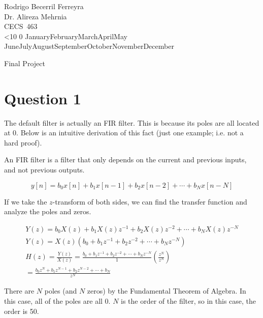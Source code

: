 \documentclass{article}
\renewcommand{\today}{\ifnum\number\day<10 0\fi \number\day \space%
\ifcase \month \or January\or February\or March\or April\or May%
\or June\or July\or August\or September\or October\or November\or December\fi\space%
\number \year}
\begin{document}
\noindent
Rodrigo Becerril Ferreyra\\
Dr. Alireza Mehrnia\\
CECS~463\\
\today

\noindent
{\centering Final Project}

\section*{Question 1}
The default filter is actually an FIR filter. This is because
its poles are all located at 0. Below is an intuitive derivation of
this fact (just one example; i.e. not a hard proof).

An FIR filter is a filter that only depends on the current and
previous inputs, and not previous outputs.

\begin{equation*}
    y[n] = b_0 x[n] + b_1 x[n-1] + b_2 x[n-2] + \cdots + b_N x[n-N]
\end{equation*}

If we take the \(z\)-transform of both sides, we can find the
transfer function and analyze the poles and zeros.

\begin{gather*}
    Y(z) = b_0 X(z) + b_1 X(z)z^{-1} + b_2X(z)z^{-2} + \cdots + b_N X(z)z^{-N}\\
    Y(z) = X(z) (b_0 + b_1 z^{-1} + b_2 z^{-2} + \cdots + b_N z^{-N})\\
    H(z) = \frac{Y(z)}{X(z)} = \frac{b_0 + b_1 z^{-1} + b_2 z^{-2} + \cdots + b_N z^{-N}}{1} \left(\frac{z^N}{z^N}\right)\\
    = \frac{b_0z^N + b_1 z^{N-1} + b_2 z^{N-2} + \cdots + b_N}{z^N}
\end{gather*}

There are \(N\) poles (and \(N\) zeros) by the Fundamental
Theorem of Algebra. In this case, all of the poles are all 0.
\(N\) is the order of the filter, so in this case,
the order is 50.
\end{document}
